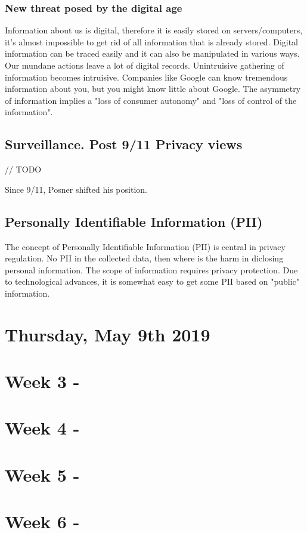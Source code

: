 \documentclass{article}
\begin{document}
\subsubsection{New threat posed by the digital age}

Information about us is digital, therefore it is easily stored on servers/computers, it's almost impossible to get rid of all information that is already stored. Digital information can be traced easily and it can also be manipulated in various ways. Our mundane actions leave a lot of digital records. Unintruisive gathering of information becomes intruisive. Companies like Google can know tremendous information about you, but you might know little about Google. The asymmetry of information implies a "loss of consumer autonomy" and "loss of control of the information".

\subsection{Surveillance. Post 9/11 Privacy views}

// TODO

Since 9/11, Posner shifted his position.

\subsection{Personally Identifiable Information (PII)}

The concept of Personally Identifiable Information (PII) is central in privacy regulation. No PII in the collected data, then where is the harm in diclosing personal information. The scope of information requires privacy protection. Due to technological advances, it is somewhat easy to get some PII based on "public" information.

\section{Thursday, May 9th 2019}

\section{Week 3 - }

\section{Week 4 - }

\section{Week 5 - }

\section{Week 6 - }
\end{document}
